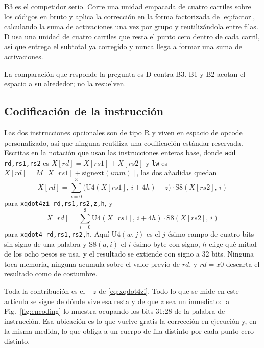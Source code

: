 B3 es el competidor serio. Corre una unidad empacada de cuatro carriles sobre
los códigos en bruto y aplica la corrección en la forma factorizada de
\eqref{eq:factor}, calculando la suma de activaciones una vez por grupo y
reutilizándola entre filas. D usa una unidad de cuatro carriles que resta el
punto cero dentro de cada carril, así que entrega el subtotal ya corregido y
nunca llega a formar una suma de activaciones.

La comparación que responde la pregunta es D contra B3. B1 y B2 acotan el
espacio a su alrededor; no la resuelven.

\subsection{Codificación de la instrucción}
Las dos instrucciones opcionales son de tipo R y viven en espacio de opcode
personalizado, así que ninguna reutiliza una codificación estándar reservada.
Escritas en la notación que usan las instrucciones enteras base, donde
\texttt{add rd,rs1,rs2} es \(X[rd]=X[rs1]+X[rs2]\) y \texttt{lw} es
\(X[rd]=M[X[rs1]+\mathrm{signext}(\mathit{imm})]\), las dos añadidas quedan
\begin{equation}
X[rd]=\sum_{i=0}^{3}\bigl(\mathrm{U4}(X[rs1],\,i{+}4h)-z\bigr)\cdot\mathrm{S8}(X[rs2],\,i)
\label{eq:xqdot4zi}
\end{equation}
para \texttt{xqdot4zi rd,rs1,rs2,z,h}, y
\begin{equation}
X[rd]=\sum_{i=0}^{3}\mathrm{U4}(X[rs1],\,i{+}4h)\cdot\mathrm{S8}(X[rs2],\,i)
\label{eq:xqdot4}
\end{equation}
para \texttt{xqdot4 rd,rs1,rs2,h}. Aquí \(\mathrm{U4}(w,j)\) es el \(j\)-ésimo
campo de cuatro bits sin signo de una palabra y \(\mathrm{S8}(a,i)\) el
\(i\)-ésimo byte con signo, \(h\) elige qué mitad de los ocho pesos se usa, y el
resultado se extiende con signo a 32 bits. Ninguna toca memoria, ninguna acumula
sobre el valor previo de \(rd\), y \(rd=x0\) descarta el resultado como de
costumbre.

Toda la contribución es el \(-z\) de \eqref{eq:xqdot4zi}. Todo lo que se mide en
este artículo se sigue de dónde vive esa resta y de que \(z\) sea un inmediato: la
Fig.~\ref{fig:encoding} lo muestra ocupando los bits 31:28 de la palabra de
instrucción. Esa ubicación es lo que vuelve gratis la corrección en ejecución y,
en la misma medida, lo que obliga a un cuerpo de fila distinto por cada punto
cero distinto.



